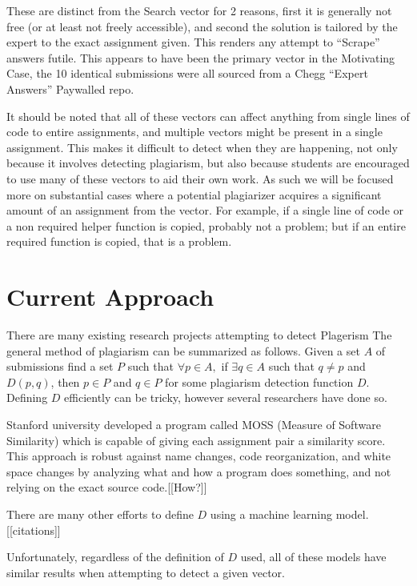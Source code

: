 \documentclass[12pt,final,thesis,actual]{uhthesis}
\newcommand{\n}{\hfill\break}
\begin{document}
\begin{itemize}
\begin{itemize}
	
	\end{itemize} These are distinct from the Search vector for 2 reasons, first it is generally not free (or at least not freely accessible), and second the solution is tailored by the expert to the exact assignment given.  This renders any attempt to ``Scrape'' answers futile.
	This appears to have been the primary vector in the Motivating Case, the 10 identical submissions were all sourced from a Chegg ``Expert Answers'' Paywalled repo.
\end{itemize}
 It should be noted that all of these vectors can affect anything from single lines of code to entire assignments, and multiple vectors might be present in a single assignment.
	This makes it difficult to detect when they are happening, not only because it involves detecting plagiarism, but also because students are encouraged to use many of these vectors to aid their own work.  As such we will be focused more on substantial cases where a potential plagiarizer acquires a significant amount of an assignment from the vector.  For example, if a single line of code or a non required helper function is copied, probably not a problem; but if an entire required function is copied, that is a problem.

\n\chapter{\textbf{Current Approach}}
	There are many existing research projects attempting to detect Plagerism The general method of plagiarism can be summarized as follows.  Given a set $A$ of submissions find a set $P$ such that  $\forall p\in A,$ if $\exists q\in A$ such that $q\not=p$ and $D(p,q)$, then $p\in P$ and $q\in P$ for some plagiarism detection function $D$.  Defining $D$ efficiently can be tricky, however several researchers have done so.
	
		Stanford university developed a program called MOSS (Measure of Software Similarity) which is capable of giving each assignment pair a similarity score. This approach is robust against name changes, code reorganization, and white space changes by analyzing what and how a program does something, and not relying on the exact source code.[[How?]]
	
	
	There are many other efforts to define $D$ using a machine learning model.[[citations]]
	
	Unfortunately, regardless of the definition of $D$ used, all of these models have similar results when attempting to detect a given vector.
\end{document}
